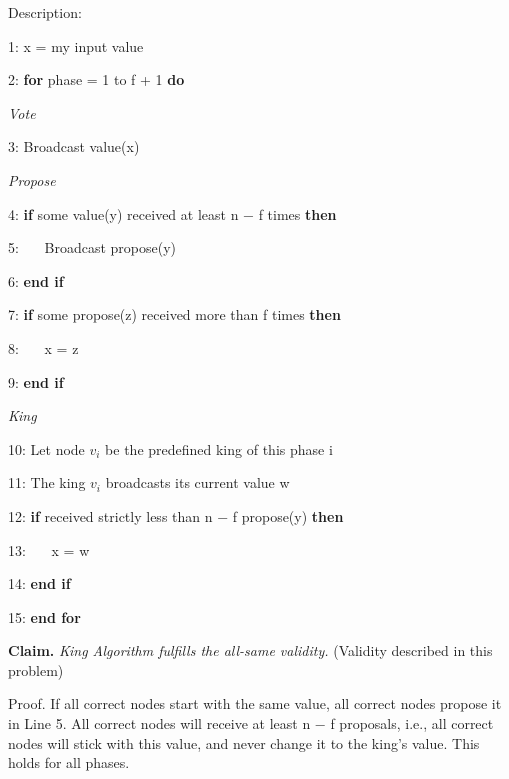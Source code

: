 \documentclass{article}
\begin{document}
\begin{enumerate}
Description:

1: x = my input value

2: \textbf{for} phase = 1 to f + 1 \textbf{do}

\emph{Vote}

3: Broadcast value(x)

\emph{Propose}

4: \textbf{if} some value(y) received at least n − f times \textbf{then}

5: \ \ \   Broadcast propose(y)

6: \textbf{end if}

7: \textbf{if} some propose(z) received more than f times \textbf{then}

8: \ \ \   x = z

9: \textbf{end if}

\emph{King}

10: Let node $v_{i}$ be the predefined king of this phase i

11: The king $v_{i}$ broadcasts its current value w

12: \textbf{if} received strictly less than n − f propose(y) \textbf{then}

13: \ \ \   x = w

14: \textbf{end if}

15: \textbf{end for}


\textbf{Claim.} \emph{King Algorithm fulfills the all-same validity.} (Validity described in this problem)

Proof. If all correct nodes start with the same value, all correct nodes propose it
in Line 5. All correct nodes will receive at least n − f proposals, i.e., all correct
nodes will stick with this value, and never change it to the king’s value. This
holds for all phases.




\end{enumerate}
\end{document}
